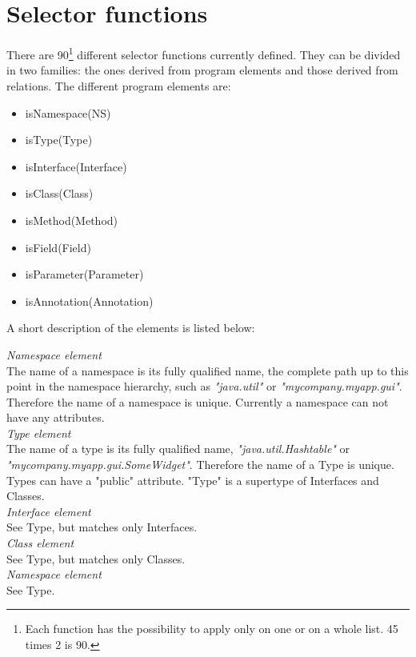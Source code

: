 \chapter{Selector functions} \label{appendix:selectorfunctions}
There are 90\footnote{Each function has the possibility to apply only on one or on a whole list. 45 times 2 is 90.} different selector functions currently defined. They can be
divided in two families: the ones derived from program elements and those
derived from relations. The different program elements are:
\begin{itemize}
	\item isNamespace(NS)
  \item isType(Type)
  \item isInterface(Interface)
  \item isClass(Class)
  \item isMethod(Method)
  \item isField(Field)
  \item isParameter(Parameter)
  \item isAnnotation(Annotation)
\end{itemize}
A short description of the elements is listed below: %

\emph{Namespace element}\\    
The name of a namespace is its fully qualified name, \ie the complete path up to this point in the namespace hierarchy, such as \emph{"java.util"} or \emph{"mycompany.myapp.gui"}. Therefore the name of a namespace is unique. Currently a namespace can not have any attributes.\\

\emph{Type element}\\
The name of a type is its fully qualified name, \eg \emph{"java.util.Hashtable"} or
\emph{"mycompany.myapp.gui.SomeWidget"}. Therefore the name of a Type is unique. Types can have a "public" attribute.
"Type" is a supertype of Interfaces and Classes.\\

\emph{Interface element}\\
See Type, but matches only Interfaces.\\

\emph{Class element}\\
See Type, but matches only Classes.\\

\emph{Namespace element}\\
See Type.\\

